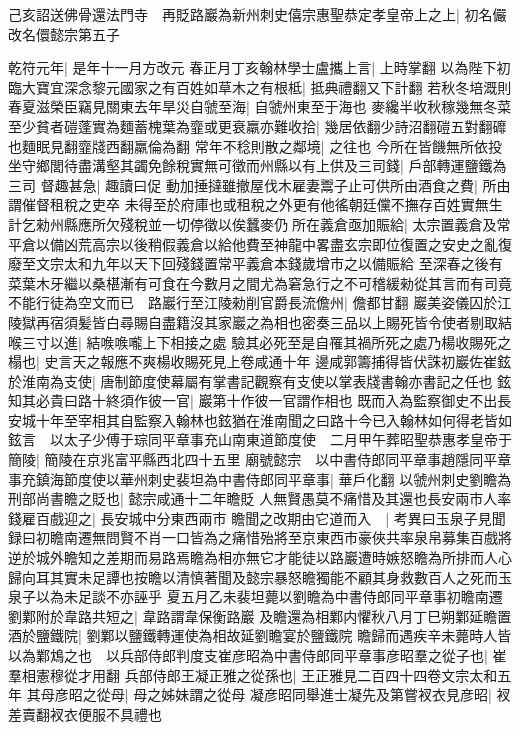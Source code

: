 己亥詔送佛骨還法門寺　再貶路巖為新州刺史僖宗惠聖恭定孝皇帝上之上|{
	初名儼改名儇懿宗第五子}


乾符元年|{
	是年十一月方改元}
春正月丁亥翰林學士盧攜上言|{
	上時掌翻}
以為陛下初臨大寶宜深念黎元國家之有百姓如草木之有根柢|{
	抵典禮翻又下計翻}
若秋冬培溉則春夏滋榮臣竊見關東去年旱災自虢至海|{
	自虢州東至于海也}
麥纔半收秋稼幾無冬菜至少貧者磑蓬實為麵蓄槐葉為韲或更衰羸亦難收拾|{
	幾居依翻少詩沼翻磑五對翻䃺也麵眠見翻韲牋西翻羸倫為翻}
常年不稔則散之鄰境|{
	之往也}
今所在皆饑無所依投坐守鄉閭待盡溝壑其蠲免餘稅實無可徵而州縣以有上供及三司錢|{
	戶部轉運鹽鐵為三司}
督趣甚急|{
	趣讀曰促}
動加捶撻雖撤屋伐木雇妻鬻子止可供所由酒食之費|{
	所由謂催督租稅之吏卒}
未得至於府庫也或租稅之外更有他徭朝廷儻不撫存百姓實無生計乞勑州縣應所欠殘稅並一切停徵以俟蠶麥仍所在義倉亟加賑給|{
	太宗置義倉及常平倉以備凶荒高宗以後稍假義倉以給他費至神龍中畧盡玄宗即位復置之安史之亂復廢至文宗太和九年以天下回殘錢置常平義倉本錢歲增市之以備賑給}
至深春之後有菜葉木牙繼以桑椹漸有可食在今數月之間尤為窘急行之不可稽緩勑從其言而有司竟不能行徒為空文而已　路巖行至江陵勑削官爵長流儋州|{
	儋都甘翻}
巖美姿儀囚於江陵獄再宿須髪皆白尋賜自盡籍沒其家巖之為相也密奏三品以上賜死皆令使者剔取結喉三寸以進|{
	結㗋㗋嚨上下相接之處}
驗其必死至是自罹其禍所死之處乃楊收賜死之榻也|{
	史言天之報應不爽楊收賜死見上卷咸通十年}
邊咸郭籌捕得皆伏誅初巖佐崔鉉於淮南為支使|{
	唐制節度使幕屬有掌書記觀察有支使以掌表牋書翰亦書記之任也}
鉉知其必貴曰路十終須作彼一官|{
	巖第十作彼一官謂作相也}
既而入為監察御史不出長安城十年至宰相其自監察入翰林也鉉猶在淮南聞之曰路十今已入翰林如何得老皆如鉉言　以太子少傅于琮同平章事充山南東道節度使　二月甲午葬昭聖恭惠孝皇帝于簡陵|{
	簡陵在京兆富平縣西北四十五里}
廟號懿宗　以中書侍郎同平章事趙隱同平章事充鎮海節度使以華州刺史裴坦為中書侍郎同平章事|{
	華戶化翻}
以虢州刺史劉瞻為刑部尚書瞻之貶也|{
	懿宗咸通十二年瞻貶}
人無賢愚莫不痛惜及其還也長安兩市人率錢雇百戲迎之|{
	長安城中分東西兩市}
瞻聞之改期由它道而入　|{
	考異曰玉泉子見聞録曰初瞻南遷無問賢不肖一口皆為之痛惜殆將至京東西市豪俠共率泉帛募集百戲將逆於城外瞻知之差期而易路焉瞻為相亦無它才能徒以路巖遭時嫉怒瞻為所排而人心歸向耳其實未足譚也按瞻以清慎著聞及懿宗暴怒瞻獨能不顧其身救數百人之死而玉泉子以為未足談不亦誣乎}
夏五月乙未裴坦薨以劉瞻為中書侍郎同平章事初瞻南遷劉鄴附於韋路共短之|{
	韋路謂韋保衡路巖}
及瞻還為相鄴内懼秋八月丁巳朔鄴延瞻置酒於鹽鐵院|{
	劉鄴以鹽鐵轉運使為相故延劉瞻宴於鹽鐵院}
瞻歸而遇疾辛未薨時人皆以為鄴鴆之也　以兵部侍郎判度支崔彦昭為中書侍郎同平章事彦昭羣之從子也|{
	崔羣相憲穆從才用翻}
兵部侍郎王凝正雅之從孫也|{
	王正雅見二百四十四卷文宗太和五年}
其母彦昭之從母|{
	母之姊妹謂之從母}
凝彦昭同舉進士凝先及第嘗衩衣見彦昭|{
	衩差賣翻衩衣便服不具禮也}
